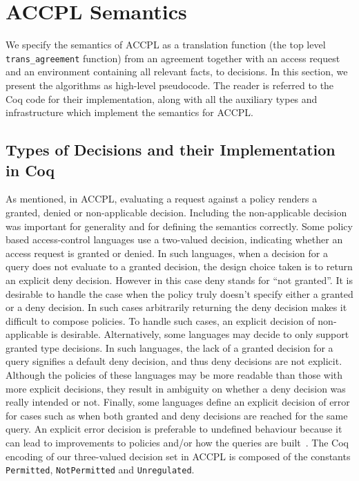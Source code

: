 \documentclass[conference]{IEEEtran}
\newcommand{\syn}{\texttt}
\begin{document}
\section{ACCPL Semantics}
We specify the semantics of \ac{ACCPL} as a translation function (the top level \syn{trans_agreement} function) from
an agreement together with an access request and an environment
containing all relevant facts, to decisions. In this section, we
present the algorithms as high-level pseudocode. The reader is
referred to the Coq code for their implementation, along with all the
auxiliary types and infrastructure which implement the semantics for
\ac{ACCPL}.


\subsection{Types of Decisions and their Implementation in Coq}\label{sec:answerandresulttypes}

As mentioned, in ACCPL, evaluating a request against a policy renders
a granted, denied or non-applicable decision. Including the non-applicable decision was
important for generality and for defining the semantics correctly.
Some policy based access-control languages use a two-valued decision,
indicating whether an access request is granted or denied. In
such languages, when a decision for a query does not evaluate to a granted decision, the design choice taken is to return an explicit deny
decision. However in this case deny stands for ``not granted''.
It is desirable to handle the case when the policy truly doesn't
specify either a granted or a deny decision. In such cases
arbitrarily returning the deny decision makes it difficult to
compose policies. To handle such cases, an explicit decision of non-applicable is desirable. Alternatively, some languages may decide
to only support granted type decisions. In such languages, the lack of a
granted decision for a query signifies a default deny decision,
and thus deny decisions are not explicit. Although the policies of
these languages may be more readable than those with more explicit
decisions, they result in ambiguity on whether a deny decision was
really intended or not. Finally, some languages define an explicit
decision of error for cases such as when both granted and
deny decisions are reached for the same query. An explicit
error decision is preferable to undefined behaviour because it can
lead to improvements to policies and/or how the queries are
built~\cite{Tschantz}. The Coq encoding of our three-valued decision
set in \ac{ACCPL} is composed of the constants \syn{Permitted},
\syn{NotPermitted} and \syn{Unregulated}.
\end{document}
